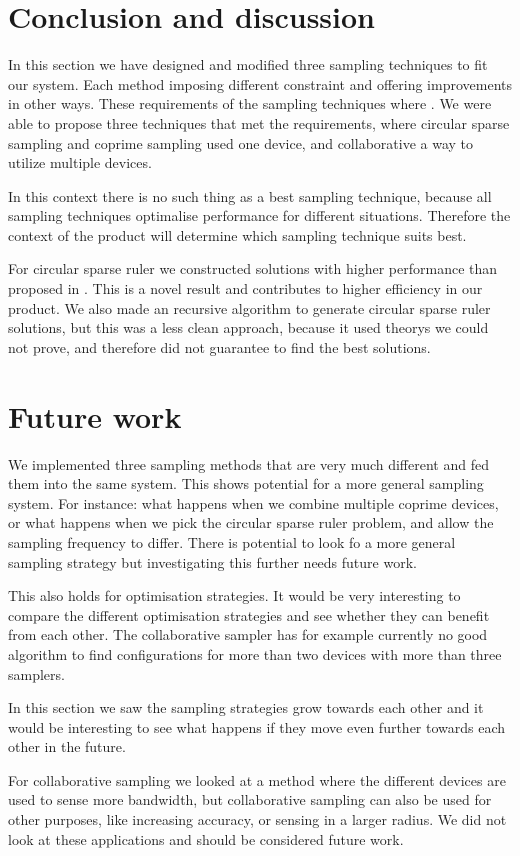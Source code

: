\documentclass[a4paper, openany, oneside]{memoir}
\begin{document}
\section{Conclusion and discussion}
In this section we have designed and modified three sampling techniques to fit our system. Each method imposing different constraint and offering improvements in other ways. These requirements of the sampling techniques where . We were able to propose three techniques that met the requirements, where circular sparse sampling and coprime sampling used one device, and collaborative a way to utilize multiple devices.

In this context there is no such thing as a best sampling technique, because all sampling techniques optimalise performance for different situations. Therefore the context of the product will determine which sampling technique suits best.

For circular sparse ruler we constructed solutions with higher performance than proposed in \cite{ariananda2012compressive}. This is a novel result and contributes to higher efficiency in our product. We also made an recursive algorithm to generate circular sparse ruler solutions,  but this was a less clean approach, because it used  theorys we could not prove, and therefore did not guarantee to find the best solutions. 

\section{Future work}
We implemented three sampling methods that are very much different and fed them into the same system. This shows potential for a more general sampling system. For instance: what happens when we combine multiple coprime devices, or what happens when we pick the circular sparse ruler problem, and allow the sampling frequency to differ. There is potential to look fo a more general sampling strategy but investigating this further needs future work.

This also holds for optimisation strategies. It would be very interesting to compare the different optimisation strategies and see whether they can benefit from each other. The collaborative sampler has for example currently no good algorithm to find configurations for more than two devices with more than three samplers. 

In this section we saw the sampling strategies grow towards each other and it would be interesting to see what happens if they move even further towards each other in the future. 

For collaborative sampling we looked at a method where the different devices are used to sense more bandwidth, but collaborative sampling can also be used for other purposes, like increasing accuracy, or sensing in a larger radius. We did not look at these applications and should be considered future work.
\end{document}
